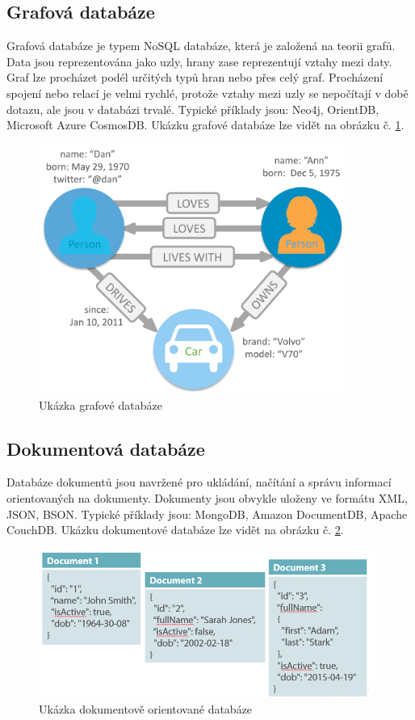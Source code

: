 \subsection{Grafová databáze}
Grafová databáze je typem NoSQL databáze, která je založená na teorii grafů. Data jsou reprezentována jako uzly, hrany zase reprezentují vztahy mezi daty. Graf lze procházet podél určitých typů hran nebo přes celý graf. Procházení spojení nebo relací je velmi rychlé, protože vztahy mezi uzly se nepočítají v době dotazu, ale jsou v databázi trvalé. Typické příklady jsou: Neo4j, OrientDB, Microsoft Azure CosmosDB. Ukázku grafové databáze lze vidět na obrázku č. \ref{fig:db_img_graph}.
	\begin{figure}[H]
	\centering
	\includegraphics[width=10cm]{img/databaze/graph_db}
	\caption{Ukázka grafové databáze}
	\label{fig:db_img_graph}
	\end{figure}
\subsection{Dokumentová databáze}
Databáze dokumentů jsou navržené pro ukládání, načítání a správu informací orientovaných na dokumenty. Dokumenty jsou obvykle uloženy ve formátu XML, JSON, BSON. 
Typické příklady jsou: MongoDB, Amazon DocumentDB, Apache CouchDB. Ukázku dokumentové databáze lze vidět na obrázku č. \ref{fig:db_img_document}.
	\begin{figure}[H]
	\centering
	\includegraphics[width=11cm]{img/databaze/document_db}
	\caption{Ukázka dokumentově orientované databáze}
	\label{fig:db_img_document}
	\end{figure}
